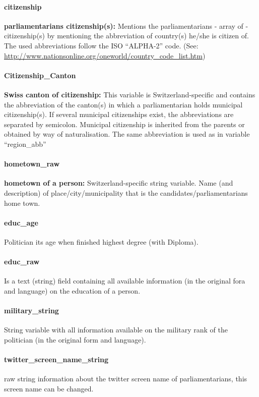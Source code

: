 \documentclass{article}
\begin{document}
\paragraph{citizenship}
    \textbf{parliamentarians citizenship(s):} Mentions the parliamentarians - array of - citizenship(s) by mentioning the abbreviation of country(s) he/she is citizen of. The used abbreviations follow the ISO ``ALPHA-2'' code. (See: \url{http://www.nationsonline.org/oneworld/country\_code\_list.htm})

\paragraph{Citizenship\_Canton}
    \textbf{Swiss canton of citizenship:} This variable is Switzerland-specific and contains the abbreviation of the canton(s) in which a parliamentarian holds municipal citizenship(s). If several municipal citizenships exist, the abbreviations are separated by semicolon. Municipal citizenship is inherited from the parents or obtained by way of naturalisation. The same abbreviation is used as in variable ``region\_abb”

\paragraph{hometown\_raw}
\textbf{hometown of a person:} Switzerland-specific string variable. Name (and description) of place/city/municipality that is the candidates/parliamentarians home town.

\paragraph{educ\_age}
    Politician its age when finished highest degree (with Diploma).
    
\paragraph{educ\_raw}
    Is a text (string) field containing all available information (in the original fora and language) on the education of a person.

\paragraph{military\_string }
    String variable with all information available on the military rank of the politician (in the original form and language).
    
    \paragraph{twitter\_screen\_name\_string }
    raw string information about the twitter screen name of parliamentarians, this screen name can be changed.
    
\end{document}
